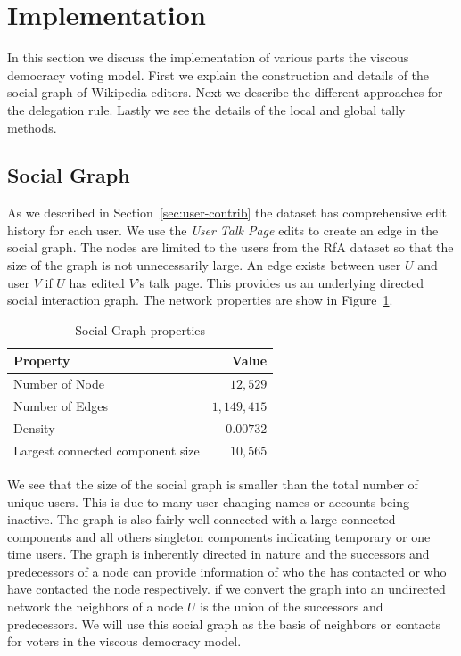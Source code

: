 \section{Implementation}
\label{sec:implementation}
In this section we discuss the implementation of various parts the viscous democracy voting model. First we explain the construction and details of the social graph of Wikipedia editors. Next we describe the different approaches for the delegation rule. Lastly we see the details of the local and global tally methods.

\subsection{Social Graph}
As we described in Section~\ref{sec:user-contrib} the \usercontrib dataset has comprehensive edit history for each user. We use the \textit{User Talk Page} edits to create an edge in the social graph. The nodes are limited to the users from the  RfA dataset so that the size of the graph is not unnecessarily large. An edge exists between user $U$ and user $V$ if $U$ has edited $V$'s talk page. This provides us an underlying directed social interaction graph. The network properties are show in Figure~\ref{tab:social-graph}.

\begin{table}
    \centering
    \begin{tabular}{lr}
        \toprule
        \textbf{Property}& \textbf{Value} \\
        \midrule
        Number of Node & $12,529$ \\
        Number of Edges & $1,149,415$ \\
        Density & $0.00732$\\
        Largest connected component size &$10,565$\\
        \bottomrule
    \end{tabular}
    \caption{Social Graph properties}
    \label{tab:social-graph}
\end{table}

We see that the size of the social graph is smaller than the total number of unique users. This is due to many user changing names or accounts being inactive. The graph is also fairly well connected with a large connected components and all others singleton components indicating temporary or one time users. The graph is inherently directed in nature and the successors and predecessors of a node can provide information of who the has contacted or who have contacted the node respectively. if we convert the graph into an undirected network the neighbors of a node $U$ is the union of the successors and predecessors. We will use this social graph as the basis of neighbors or contacts for voters in the viscous democracy model.

